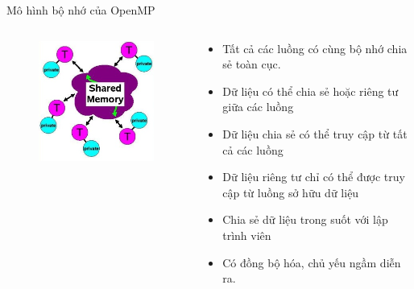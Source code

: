\documentclass[10pt]{beamer}
\theoremstyle{remark}
\numberwithin{algocf}{section}
\numberwithin{equation}{section}
\numberwithin{dl}{section}
\numberwithin{figure}{section}
\begin{document}
\begin{frame}{Mô hình bộ nhớ của OpenMP}
    \begin{columns}[onlytextwidth]
        \begin{column}{0.5\linewidth}
            \begin{figure}[H]
                \centering
                \includegraphics[width=\linewidth]{figures/OpenMP/OpenMP_Shared_Memory_Model.png}
            \end{figure}
        \end{column}
        \begin{column}{0.5\linewidth}
            \begin{itemize}
                \item Tất cả các luồng có cùng bộ nhớ chia sẻ toàn cục.
                \item Dữ liệu có thể chia sẻ hoặc riêng tư giữa các luồng
                \item Dữ liệu chia sẻ có thể truy cập từ tất cả các luồng
                \item Dữ liệu riêng tư chỉ có thể được truy cập từ luồng sở hữu dữ liệu
                \item Chia sẻ dữ liệu trong suốt với lập trình viên
                \item Có đồng bộ hóa, chủ yếu ngầm diễn ra.
            \end{itemize}
        \end{column}
    \end{columns}
    
\end{frame}
\end{document}
